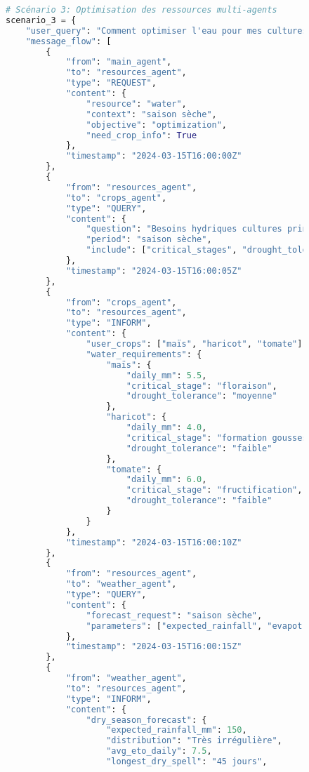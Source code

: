 \begin{figure}[h]
\begin{lstlisting}[language=Python, caption=Exemples de communications inter-agents en action]
# Scénario 3: Optimisation des ressources multi-agents
scenario_3 = {
    "user_query": "Comment optimiser l'eau pour mes cultures en saison sèche?",
    "message_flow": [
        {
            "from": "main_agent",
            "to": "resources_agent",
            "type": "REQUEST",
            "content": {
                "resource": "water",
                "context": "saison sèche",
                "objective": "optimization",
                "need_crop_info": True
            },
            "timestamp": "2024-03-15T16:00:00Z"
        },
        {
            "from": "resources_agent",
            "to": "crops_agent",
            "type": "QUERY",
            "content": {
                "question": "Besoins hydriques cultures principales utilisateur?",
                "period": "saison sèche",
                "include": ["critical_stages", "drought_tolerance"]
            },
            "timestamp": "2024-03-15T16:00:05Z"
        },
        {
            "from": "crops_agent",
            "to": "resources_agent",
            "type": "INFORM",
            "content": {
                "user_crops": ["maïs", "haricot", "tomate"],
                "water_requirements": {
                    "maïs": {
                        "daily_mm": 5.5,
                        "critical_stage": "floraison",
                        "drought_tolerance": "moyenne"
                    },
                    "haricot": {
                        "daily_mm": 4.0,
                        "critical_stage": "formation gousses",
                        "drought_tolerance": "faible"
                    },
                    "tomate": {
                        "daily_mm": 6.0,
                        "critical_stage": "fructification",
                        "drought_tolerance": "faible"
                    }
                }
            },
            "timestamp": "2024-03-15T16:00:10Z"
        },
        {
            "from": "resources_agent",
            "to": "weather_agent",
            "type": "QUERY",
            "content": {
                "forecast_request": "saison sèche",
                "parameters": ["expected_rainfall", "evapotranspiration", "dry_spell_duration"]
            },
            "timestamp": "2024-03-15T16:00:15Z"
        },
        {
            "from": "weather_agent",
            "to": "resources_agent",
            "type": "INFORM",
            "content": {
                "dry_season_forecast": {
                    "expected_rainfall_mm": 150,
                    "distribution": "Très irrégulière",
                    "avg_eto_daily": 7.5,
                    "longest_dry_spell": "45 jours",

\end{lstlisting}
\end{figure}
